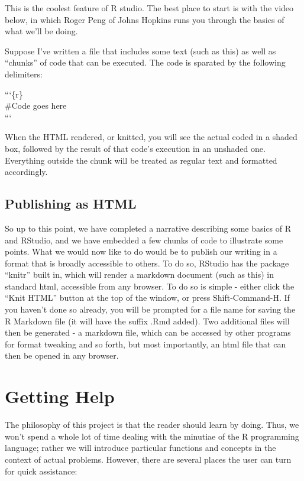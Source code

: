 \documentclass[]{tufte-book}
\begin{document}
This is the coolest feature of R studio. The best place to start is with
the video below, in which Roger Peng of Johns Hopkins runs you through
the basics of what we'll be doing.

Suppose I've written a file that includes some text (such as this) as
well as ``chunks'' of code that can be executed. The code is sparated by
the following delimiters:

```\{r\}\\
\#Code goes here\\
```

When the HTML rendered, or knitted, you will see the actual coded in a
shaded box, followed by the result of that code's execution in an
unshaded one. Everything outside the chunk will be treated as regular
text and formatted accordingly.

\section{Publishing as HTML}\label{publishing-as-html}

So up to this point, we have completed a narrative describing some
basics of R and RStudio, and we have embedded a few chunks of code to
illustrate some points. What we would now like to do would be to publish
our writing in a format that is broadly accessible to others. To do so,
RStudio has the package ``knitr'' built in, which will render a markdown
document (such as this) in standard html, accessible from any browser.
To do so is simple - either click the ``Knit HTML'' button at the top of
the window, or press Shift-Command-H. If you haven't done so already,
you will be prompted for a file name for saving the R Markdown file (it
will have the suffix .Rmd added). Two additional files will then be
generated - a markdown file, which can be accessed by other programs for
format tweaking and so forth, but most importantly, an html file that
can then be opened in any browser.

\chapter{Getting Help}\label{getting-help}

The philosophy of this project is that the reader should learn by doing.
Thus, we won't spend a whole lot of time dealing with the minutiae of
the R programming language; rather we will introduce particular
functions and concepts in the context of actual problems. However, there
are several places the user can turn for quick assistance:
\end{document}
